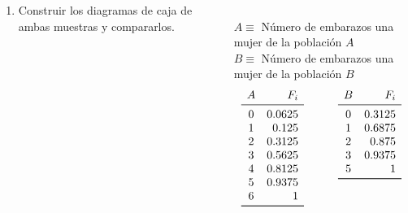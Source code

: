 \documentclass[aspectratio=149,10pt,t]{beamer}
\begin{document}
\begin{frame}
	\begin{columns}
		\begin{column}[T]{0.6\textwidth}
			\begin{enumerate}
			  \item Construir los diagramas de caja de ambas muestras y compararlos.
			\end{enumerate}
		\end{column}
		\begin{column}[T]{0.4\textwidth}
			\\
			$A\equiv$ Número de embarazos una mujer de la población $A$\\
			$B\equiv$ Número de embarazos una mujer de la población $B$
			\[
			\begin{array}{lll}
				\begin{array}[t]{cr}
					A & F_i\\
					\midrule
					0 & 0.0625\\
					1 & 0.125\\
					2 & 0.3125\\
					3 & 0.5625\\
					4 & 0.8125\\
					5 & 0.9375\\
					6 & 1\\
					\bottomrule
					\end{array} &
					\quad &
					\begin{array}[t]{cr}
						B & F_i\\
						\midrule
						0 & 0.3125\\
						1 & 0.6875\\
						2 & 0.875\\
						3 & 0.9375\\
						5 & 1\\
						\bottomrule
					\end{array}
				\end{array}
			\]
		\end{column}
	\end{columns}
\end{frame}
\end{document}
